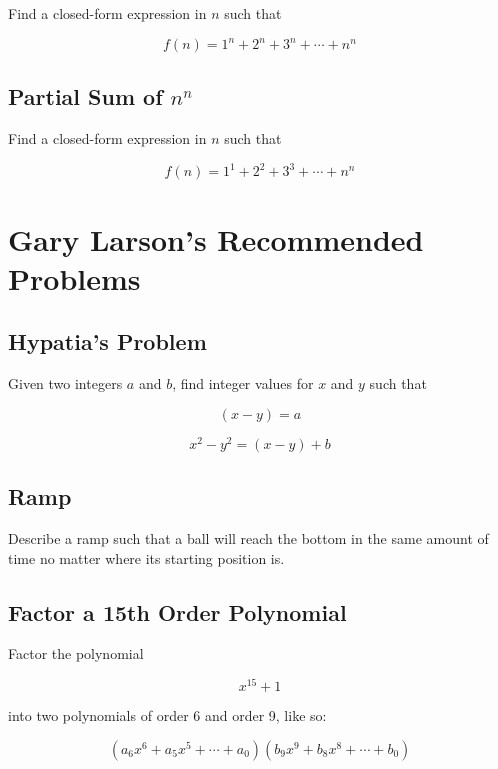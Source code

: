 \documentclass[letterpaper, 11pt]{report}
\numberwithin{equation}{section}
\begin{document}
			Find a closed-form expression in $ n $ such that
		
			\begin{equation}
				f(n) = 1^n + 2^n + 3^n + \cdots + n^n
			\end{equation}
			
			
		\section{Partial Sum of $ n^n $}
			
			Find a closed-form expression in $ n $ such that
			
			\begin{equation}
				f(n) = 1^1 + 2^2 + 3^3 + \cdots + n^n
			\end{equation}
	
	
	
	
	\chapter{Gary Larson's Recommended Problems}
		
		
		
		\section{Hypatia's Problem}
			
			Given two integers \(a\) and \(b\), find integer values for \(x\) and \(y\) such that
			
			\begin{equation}
				(x-y) = a
			\end{equation}
			
			\begin{equation}
				x^2 - y^2 = (x-y) + b
			\end{equation}
			
			
		\section{Ramp}
			
			Describe a ramp such that a ball will reach the bottom in the same amount of time no matter where its starting position is.
			
			
		\section{Factor a 15th Order Polynomial}
			
			Factor the polynomial
			
			\begin{equation}
				x^{15} + 1
			\end{equation}
			
			into two polynomials of order 6 and order 9, like so:
			
			\begin{equation}
				(a_6x^6 + a_5x^5 + \cdots + a_0)(b_9x^9 + b_8x^8 + \cdots + b_0)
			\end{equation}
			
		
	
	
\end{document}
